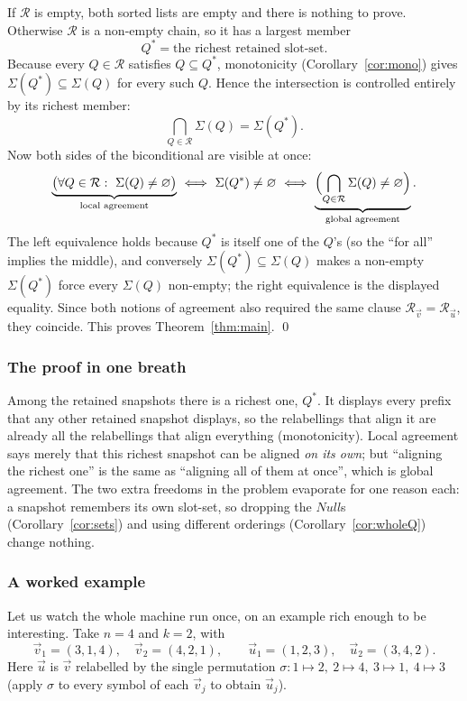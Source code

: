 If $\mathcal R$ is empty, both sorted lists are empty and there is nothing to prove.
Otherwise $\mathcal R$ is a non-empty chain, so it has a largest member
\[
Q^{\ast}=\text{the richest retained slot-set.}
\]
Because every $Q\in\mathcal R$ satisfies $Q\subseteq Q^\ast$, monotonicity
(Corollary~\ref{cor:mono}) gives $\Sigma(Q^\ast)\subseteq\Sigma(Q)$ for every such
$Q$.  Hence the intersection is controlled entirely by its richest member:
\[
\bigcap_{Q\in\mathcal R}\Sigma(Q)=\Sigma(Q^{\ast}).
\]
Now both sides of the biconditional are visible at once:
\[
\underbrace{\bigl(\forall Q\in\mathcal R:\ \Sigma(Q)\neq\varnothing\bigr)}
_{\text{local agreement}}
\ \Longleftrightarrow\
\Sigma(Q^{\ast})\neq\varnothing
\ \Longleftrightarrow\
\underbrace{\Bigl(\bigcap_{Q\in\mathcal R}\Sigma(Q)\neq\varnothing\Bigr)}
_{\text{global agreement}} .
\]
The left equivalence holds because $Q^\ast$ is itself one of the $Q$'s (so the
``for all'' implies the middle), and conversely $\Sigma(Q^\ast)\subseteq\Sigma(Q)$
makes a non-empty $\Sigma(Q^\ast)$ force every $\Sigma(Q)$ non-empty; the right
equivalence is the displayed equality.  Since both notions of agreement also
required the same clause $\mathcal R_{\vec v}=\mathcal R_{\vec u}$, they coincide.
This proves Theorem~\ref{thm:main}. \qed

\subsubsection*{The proof in one breath}

Among the retained snapshots there is a richest one, $Q^\ast$.  It displays every
prefix that any other retained snapshot displays, so the relabellings that align it
are already all the relabellings that align everything (monotonicity).  Local
agreement says merely that this richest snapshot can be aligned \emph{on its own};
but ``aligning the richest one'' is the same as ``aligning all of them at once'',
which is global agreement.  The two extra freedoms in the problem evaporate for one
reason each: a snapshot remembers its own slot-set, so dropping the $Null$s
(Corollary~\ref{cor:sets}) and using different orderings
(Corollary~\ref{cor:wholeQ}) change nothing.

\subsubsection*{A worked example}

Let us watch the whole machine run once, on an example rich enough to be
interesting.  Take $n=4$ and $k=2$, with
\[
\vec v_1=(3,1,4),\quad \vec v_2=(4,2,1),
\qquad
\vec u_1=(1,2,3),\quad \vec u_2=(3,4,2).
\]
Here $\vec u$ is $\vec v$ relabelled by the single permutation
$\sigma:1\mapsto2,\ 2\mapsto4,\ 3\mapsto1,\ 4\mapsto3$ (apply $\sigma$ to every
symbol of each $\vec v_j$ to obtain $\vec u_j$).

